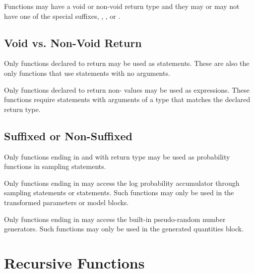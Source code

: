 Functions may have a void or non-void return type and they may or may
not have one of the special suffixes, , , or
.

\subsection{Void vs. Non-Void Return}

Only functions declared to return  may be used as
statements.  These are also the only functions that use 
statements with no arguments.

Only functions declared to return non- values may be used
as expressions.  These functions require  statements with
arguments of a type that matches the declared return type.

\subsection{Suffixed or Non-Suffixed}

Only functions ending in  and with return type 
may be used as probability functions in sampling statements. 

Only functions ending in  may access the log probability
accumulator through sampling statements or
 statements.  Such functions may only be
used in the transformed parameters or model blocks.

Only functions ending in  may access the built-in
pseudo-random number generators.  Such functions may only be used in
the generated quantities block.


\section{Recursive Functions}

